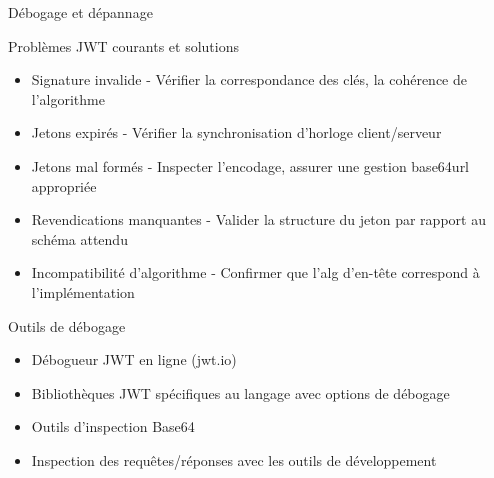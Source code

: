 \documentclass[presentation,aspectratio=169]{beamer}
\begin{document}
\begin{frame}[label={sec:org0af7ffd}]{Débogage et dépannage}
\begin{block}{Problèmes JWT courants et solutions}
\begin{itemize}[<+->]
\item \alert{Signature invalide} - Vérifier la correspondance des clés, la cohérence de l'algorithme
\item \alert{Jetons expirés} - Vérifier la synchronisation d'horloge client/serveur
\item \alert{Jetons mal formés} - Inspecter l'encodage, assurer une gestion base64url appropriée
\item \alert{Revendications manquantes} - Valider la structure du jeton par rapport au schéma attendu
\item \alert{Incompatibilité d'algorithme} - Confirmer que l'alg d'en-tête correspond à l'implémentation
\end{itemize}
\end{block}
\begin{block}{Outils de débogage}
\begin{itemize}[<+->]
\item Débogueur JWT en ligne (jwt.io)
\item Bibliothèques JWT spécifiques au langage avec options de débogage
\item Outils d'inspection Base64
\item Inspection des requêtes/réponses avec les outils de développement
\end{itemize}
\end{block}
\end{frame}
\end{document}
